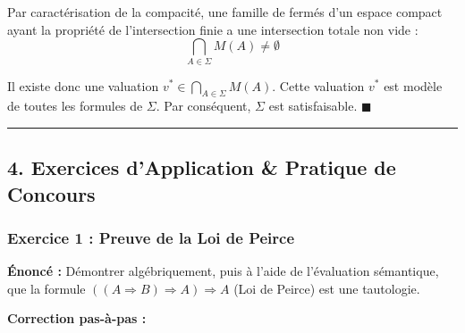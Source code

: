 \documentclass[11pt,a4paper]{article}
\begin{document}
Par caractérisation de la compacité, une famille de fermés d'un espace
compact ayant la propriété de l'intersection finie a une intersection
totale non vide : \[\bigcap_{A \in \Sigma} M(A) \neq \emptyset\]

Il existe donc une valuation \(v^* \in \bigcap_{A \in \Sigma} M(A)\).
Cette valuation \(v^*\) est modèle de toutes les formules de \(\Sigma\).
Par conséquent, \(\Sigma\) est satisfaisable. \(\blacksquare\)

\begin{center}\rule{0.5\linewidth}{0.5pt}\end{center}

\hypertarget{exercices-dapplication-pratique-de-concours}{%
\subsection{4. Exercices d'Application \& Pratique de
Concours}\label{exercices-dapplication-pratique-de-concours}}

\hypertarget{exercice-1-preuve-de-la-loi-de-peirce}{%
\subsubsection{Exercice 1 : Preuve de la Loi de
Peirce}\label{exercice-1-preuve-de-la-loi-de-peirce}}

\textbf{Énoncé :} Démontrer algébriquement, puis à l'aide de
l'évaluation sémantique, que la formule
\(((A \Rightarrow B) \Rightarrow A) \Rightarrow A\) (Loi de Peirce) est
une tautologie.

\textbf{Correction pas-à-pas :}
\end{document}
